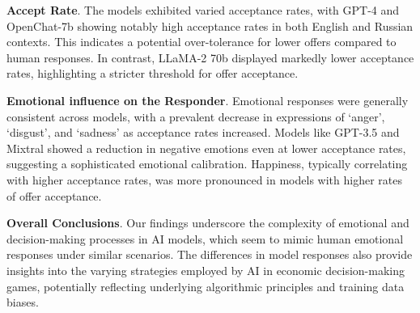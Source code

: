 \documentclass{article}
\begin{document}
\textbf{Accept Rate}. The models exhibited varied acceptance rates, with GPT-4 and OpenChat-7b showing notably high acceptance rates in both English and Russian contexts. This indicates a potential over-tolerance for lower offers compared to human responses. In contrast, LLaMA-2 70b displayed markedly lower acceptance rates, highlighting a stricter threshold for offer acceptance.

\textbf{Emotional influence on the Responder}. Emotional responses were generally consistent across models, with a prevalent decrease in expressions of `anger', `disgust', and `sadness' as acceptance rates increased. Models like GPT-3.5 and Mixtral showed a reduction in negative emotions even at lower acceptance rates, suggesting a sophisticated emotional calibration. Happiness, typically correlating with higher acceptance rates, was more pronounced in models with higher rates of offer acceptance.




\textbf{Overall Conclusions}. Our findings underscore the complexity of emotional and decision-making processes in AI models, which seem to mimic human emotional responses under similar scenarios. The differences in model responses also provide insights into the varying strategies employed by AI in economic decision-making games, potentially reflecting underlying algorithmic principles and training data biases.






\end{document}

